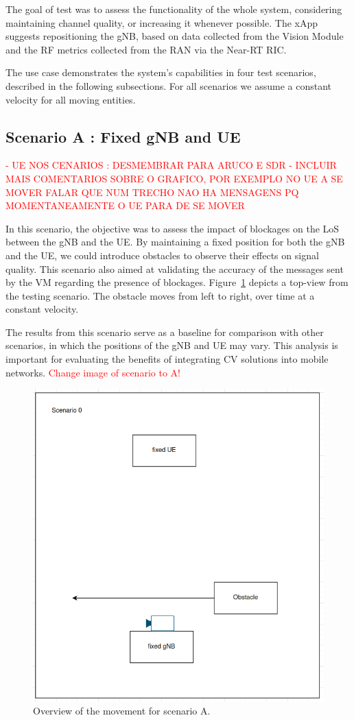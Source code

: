 The goal of test was to assess the functionality of the whole system, considering maintaining channel quality, or increasing it whenever possible.
The xApp suggests repositioning the gNB, based on data collected from the Vision Module and the RF metrics collected from the RAN via the Near-RT RIC\@.

The use case demonstrates the system's capabilities in four test scenarios, described in the following subsections.
For all scenarios we assume a constant velocity for all moving entities.

\subsection{Scenario A : Fixed gNB and UE}\label{subsec:scenario-0-:-fixed-gnb-and-ue}
\textcolor{red}{- UE NOS CENARIOS : DESMEMBRAR PARA ARUCO E SDR
- INCLUIR MAIS COMENTARIOS SOBRE O GRAFICO, POR EXEMPLO NO UE A SE MOVER FALAR QUE NUM TRECHO NAO HA MENSAGENS PQ MOMENTANEAMENTE O UE PARA DE SE MOVER}

In this scenario, the objective was to assess the impact of blockages on the LoS between the gNB and the UE\@.
By maintaining a fixed position for both the gNB and the UE, we could introduce obstacles to observe their effects on signal quality.
This scenario also aimed at validating the accuracy of the messages sent by the VM regarding the presence of blockages.
Figure~\ref{fig:test_fixed} depicts a top-view from the testing scenario.
The obstacle moves from left to right, over time at a constant velocity.

The results from this scenario serve as a baseline for comparison with other scenarios, in which the positions of the gNB and UE may vary.
This analysis is important for evaluating the benefits of integrating CV solutions into mobile networks.
\textcolor{red}{Change image of scenario to A!}
\begin{figure}[H]
    \centering
    \includegraphics[width=0.5\linewidth]{figures/scenario0}
    \caption{Overview of the movement for scenario A.}
    \label{fig:test_fixed}
\end{figure}

